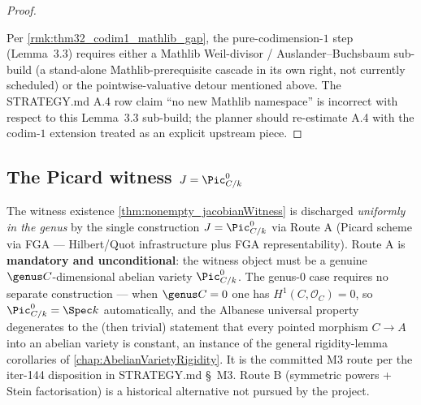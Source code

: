 \begin{proof}
\begin{itemize}
  \end{itemize}
  Per \cref{rmk:thm32_codim1_mathlib_gap}, the pure-codimension-\(1\) step (Lemma~3.3) requires either a Mathlib Weil-divisor / Auslander--Buchsbaum sub-build (a stand-alone Mathlib-prerequisite cascade in its own right, not currently scheduled) or the pointwise-valuative detour mentioned above. The STRATEGY.md A.4 row claim ``no new Mathlib namespace'' is incorrect with respect to this Lemma~3.3 sub-build; the planner should re-estimate A.4 with the codim-\(1\) extension treated as an explicit upstream piece.
\end{proof}
\subsection{The Picard witness \(J = \Pic^0_{C/k}\)}
\label{sec:picardJacobianWitness}
The witness existence \cref{thm:nonempty_jacobianWitness} is discharged \emph{uniformly in the genus} by the single construction \(J = \Pic^0_{C/k}\) via Route A (Picard scheme via FGA --- Hilbert/Quot infrastructure plus FGA representability). Route A is \textbf{mandatory and unconditional}: the witness object must be a genuine \(\genus C\)-dimensional abelian variety \(\Pic^0_{C/k}\). The genus-\(0\) case requires no separate construction --- when \(\genus C = 0\) one has \(H^1(C, \mathcal O_C) = 0\), so \(\Pic^0_{C/k} = \Spec k\) automatically, and the Albanese universal property degenerates to the (then trivial) statement that every pointed morphism \(C \to A\) into an abelian variety is constant, an instance of the general rigidity-lemma corollaries of \cref{chap:AbelianVarietyRigidity}. It is the committed M3 route per the iter-144 disposition in STRATEGY.md \S~M3. Route B (symmetric powers + Stein factorisation) is a historical alternative not pursued by the project.
